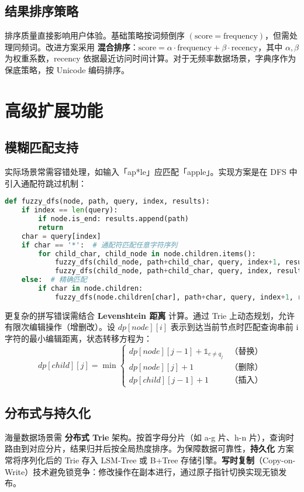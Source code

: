 \section{结果排序策略}
排序质量直接影响用户体验。基础策略按词频倒序 $(\text{score} = \text{frequency})$，但需处理同频词。改进方案采用 \textbf{混合排序}：$\text{score} = \alpha \cdot \text{frequency} + \beta \cdot \text{recency}$，其中 $\alpha, \beta$ 为权重系数，recency 依据最近访问时间计算。对于无频率数据场景，字典序作为保底策略，按 Unicode 编码排序。\par
\chapter{高级扩展功能}
\section{模糊匹配支持}
实际场景常需容错处理，如输入「ap*le」应匹配「apple」。实现方案是在 DFS 中引入通配符跳过机制：\par
\begin{lstlisting}[language=python]
def fuzzy_dfs(node, path, query, index, results):
    if index == len(query):
        if node.is_end: results.append(path)
        return
    char = query[index]
    if char == '*':  # 通配符匹配任意字符序列
        for child_char, child_node in node.children.items():
            fuzzy_dfs(child_node, path+child_char, query, index+1, results)
            fuzzy_dfs(child_node, path+child_char, query, index, results)  # 继续匹配当前*
    else:  # 精确匹配
        if char in node.children:
            fuzzy_dfs(node.children[char], path+char, query, index+1, results)
\end{lstlisting}
更复杂的拼写错误需结合 \textbf{Levenshtein 距离} 计算。通过 Trie 上动态规划，允许有限次编辑操作（增删改）。设 $dp[node][i]$ 表示到达当前节点时匹配查询串前 i 字符的最小编辑距离，状态转移方程为：
$$dp[child][j] = \min \begin{cases} dp[node][j-1] + \mathbb{1}_{c \neq q_j} & \text{（替换）} \\ dp[node][j] + 1 & \text{（删除）} \\ dp[child][j-1] + 1 & \text{（插入）} \end{cases}$$\par
\section{分布式与持久化}
海量数据场景需 \textbf{分布式 Trie} 架构。按首字母分片（如 a-g 片、h-n 片），查询时路由到对应分片，结果归并后按全局热度排序。为保障数据可靠性，\textbf{持久化} 方案常将序列化后的 Trie 存入 LSM-Tree 或 B+Tree 存储引擎。\textbf{写时复制}（Copy-on-Write）技术避免锁竞争：修改操作在副本进行，通过原子指针切换实现无锁发布。\par
